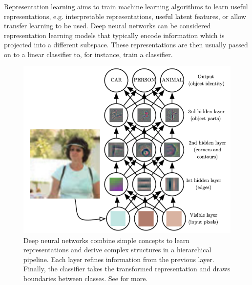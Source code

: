 Representation learning aims to train machine learning algorithms to learn useful representations, e.g. interpretable representations, useful latent features, or allow transfer learning to be used. 
Deep neural networks can be considered representation learning models that typically encode information which is projected into a different subspace. These representations are then usually passed on to a linear classifier to, for instance, train a classifier. 
\begin{figure}[h]
    \centering
    \includegraphics[scale=0.4]{chapters/assets/ssl_figs/ssl_rep_learning_images.png}
    \caption{Deep neural networks combine simple concepts to learn representations and derive complex structures in a hierarchical pipeline. Each layer refines  information from the previous layer. Finally, the  classifier takes the transformed representation and draws boundaries between classes. See  for more.}
    \label{fig:small-cnn-features}
\end{figure}

